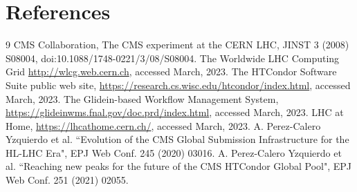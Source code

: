 \documentclass[a4paper]{jpconf}
\begin{document}
\section*{References}
\begin{thebibliography}{9}
 CMS Collaboration, The CMS experiment at the CERN LHC, 
JINST 3 (2008) S08004, doi:10.1088/1748-0221/3/08/S08004.
 The Worldwide LHC Computing Grid \url{http://wlcg.web.cern.ch}, accessed March, 2023.
 The HTCondor Software Suite public web site, \url{https://research.cs.wisc.edu/htcondor/index.html}, accessed March, 2023.
 The Glidein-based Workflow Management System, \url{https://glideinwms.fnal.gov/doc.prd/index.html}, accessed March, 2023.
 LHC at Home, \url{https://lhcathome.cern.ch/}, accessed March, 2023. 
 A. Perez-Calero Yzquierdo et al. ``Evolution of the CMS Global Submission Infrastructure for the HL-LHC Era", EPJ Web Conf. 245 (2020) 03016.
 A. Perez-Calero Yzquierdo et al. ``Reaching new peaks for the future of the CMS HTCondor Global Pool", EPJ Web Conf. 251 (2021) 02055.
\end{thebibliography}
\end{document}
